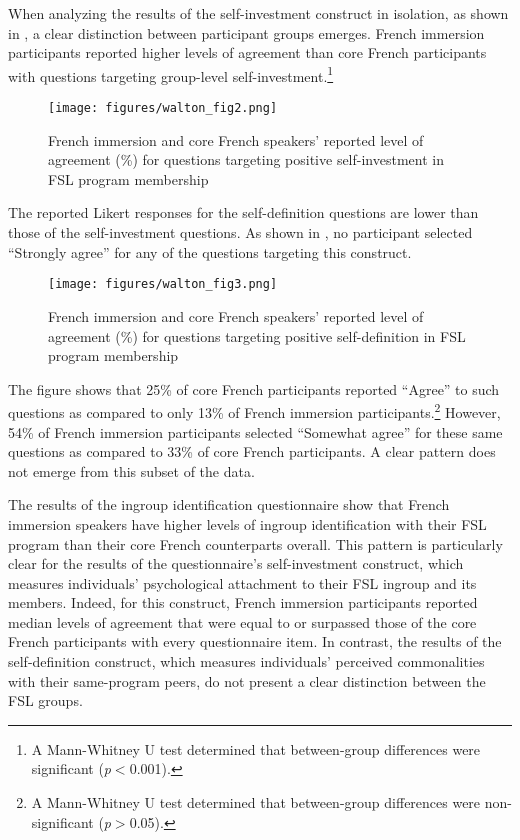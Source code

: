 \documentclass[output=paper,colorlinks,citecolor=brown,draftmode]{langscibook}
\begin{document}
When analyzing the results of the self-investment construct in isolation, as shown in , a clear distinction between participant groups emerges. French immersion participants reported higher levels of agreement than core French participants with questions targeting group-level self-investment.\footnote{A Mann-Whitney U test determined that between-group differences were significant (\textit{p}$<$0.001).}

\begin{figure}
    \texttt{[image: figures/walton\_fig2.png]}
    \caption{French immersion and core French speakers’ reported level of agreement (\%) for questions targeting positive self-investment in FSL program membership}
    \label{SI.Program}
\end{figure}

The reported Likert responses for the self-definition questions are lower than those of the self-investment questions. As shown in , no participant selected “Strongly agree” for any of the questions targeting this construct.

\begin{figure}
    \texttt{[image: figures/walton\_fig3.png]}
    \caption{French immersion and core French speakers’ reported level of agreement (\%) for questions targeting positive self-definition in FSL program membership}
    \label{SD.Program}
\end{figure}

\noindent The figure shows that 25\% of core French participants reported “Agree” to such questions as compared to only 13\% of French immersion participants.\footnote{A Mann-Whitney U test determined that between-group differences were non-significant (\textit{p}$>$0.05).} However, 54\% of French immersion participants selected “Somewhat agree” for these same questions as compared to 33\% of core French participants. A clear pattern does not emerge from this subset of the data.

The results of the ingroup identification questionnaire show that French immersion speakers have higher levels of ingroup identification with their FSL program than their core French counterparts overall. This pattern is particularly clear for the results of the questionnaire’s self-investment construct, which measures individuals’ psychological attachment to their FSL ingroup and its members. Indeed, for this construct, French immersion participants reported median levels of agreement that were equal to or surpassed those of the core French participants with every questionnaire item. In contrast, the results of the self-definition construct, which measures individuals’ perceived commonalities with their same-program peers, do not present a clear distinction between the FSL groups.
\end{document}
